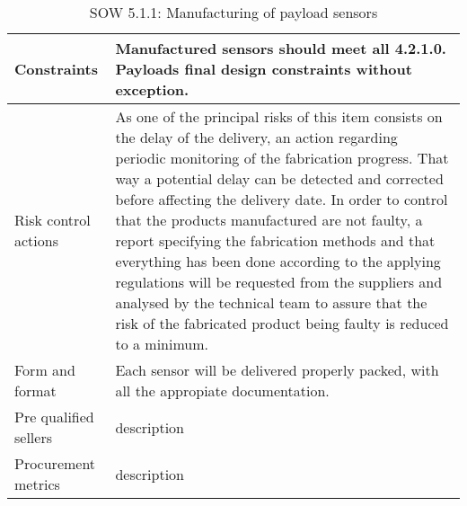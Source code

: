 \begin{table}[H]
\begin{tabular}{>{\raggedright\arraybackslash}p{3cm} >{\arraybackslash}p{11cm}}
		\midrule
		
		Constraints & Manufactured sensors should meet all 4.2.1.0. Payloads final design constraints without exception.\vspace{0.2cm} \\
		
		\midrule
		
		Risk control actions & As one of the principal risks of this item consists on the delay of the delivery, an action regarding periodic monitoring of the fabrication progress. That way a potential delay can be detected and corrected before affecting the delivery date.
		In order to control that the products manufactured are not faulty, a report specifying the fabrication methods and that everything has been done according to the applying regulations will be requested from the suppliers and analysed by the technical team to assure that the risk of the fabricated product being faulty is reduced to a minimum.\vspace{0.2cm} \\
		
		\midrule
		
		Form and format & Each sensor will be delivered properly packed, with all the appropiate documentation.\vspace{0.2cm} \\
		
		\midrule
		
		Pre qualified sellers & description\vspace{0.2cm} \\
		
		\midrule
		
		Procurement metrics & description\vspace{0.2cm} \\
		
		\bottomrule[2pt]		
		
	\end{tabular}
	\caption{SOW 5.1.1: Manufacturing of payload sensors}
\end{table}

